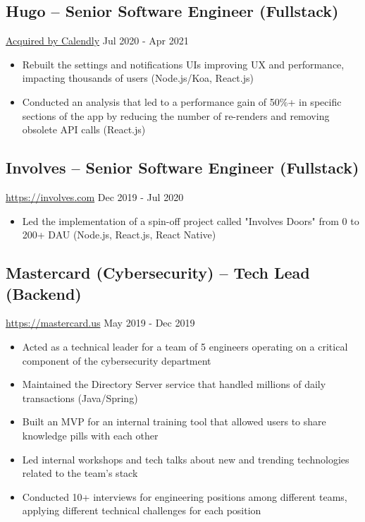 \documentclass[11pt, a4paper]{article}
\begin{document}
\subsection*{Hugo -- Senior Software Engineer (Fullstack)}
\href{https://www.linkedin.com/company/hugo-team/}{Acquired by Calendly} \hfill Jul 2020 - Apr 2021
\begin{itemize}[noitemsep]
    \item Rebuilt the settings and notifications UIs improving UX and performance, impacting thousands of users (Node.js/Koa, React.js)
    \item Conducted an analysis that led to a performance gain of 50\%+ in specific sections of the app by reducing the number of re-renders and removing obsolete API calls (React.js)
\end{itemize}

\subsection*{Involves -- Senior Software Engineer (Fullstack)}
\href{https://involves.com/}{https://involves.com} \hfill Dec 2019 - Jul 2020
\begin{itemize}[noitemsep]
    \item Led the implementation of a spin-off project called "Involves Doors" from 0 to 200+ DAU (Node.js, React.js, React Native)
\end{itemize}

\subsection*{Mastercard (Cybersecurity) -- Tech Lead (Backend)}
\href{https://www.mastercard.us/en-us.html}{https://mastercard.us} \hfill May 2019 - Dec 2019
\begin{itemize}[noitemsep]
    \item Acted as a technical leader for a team of 5 engineers operating on a critical component of the cybersecurity department
    \item Maintained the Directory Server service that handled millions of daily transactions (Java/Spring)
    \item Built an MVP for an internal training tool that allowed users to share knowledge pills with each other
    \item Led internal workshops and tech talks about new and trending technologies related to the team's stack
    \item Conducted 10+ interviews for engineering positions among different teams, applying different technical challenges for each position
\end{itemize}
\end{document}
